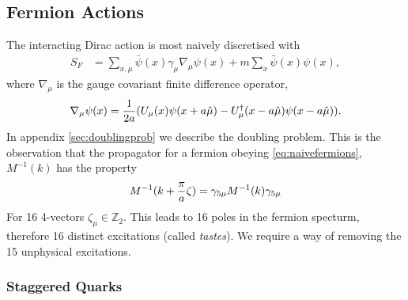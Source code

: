 \documentclass[a4paper,10pt]{article}
\numberwithin{equation}{section}
\begin{document}
\subsection{Fermion Actions}

The interacting Dirac action is most naively discretised with
\begin{align}
 S_F &= \sum_{x,\mu} \bar{\psi}(x) \gamma_{\mu} \nabla_{\mu} \psi(x) + m\sum_x \bar{\psi}(x) \psi(x),
 \label{eq:naivefermions}
\end{align}
where $\nabla_{\mu}$ is the gauge covariant finite difference operator,
\begin{align}	
	\nabla_{\mu} \psi(x) = {1\over 2a} ( U_{\mu} (x) \psi(x+a\hat{\mu}) - U^{\dagger}_{\mu}(x-a\hat{\mu})\psi(x-a\hat{\mu}) ).
\label{eq:lat_derivative}
\end{align}
In appendix \ref{sec:doublingprob} we describe the doubling problem. This is the observation that the propagator for a fermion obeying \eqref{eq:naivefermions}, $M^{-1}(k)$ has the property
\begin{align}
	M^{-1}(k+{\pi\over a}\zeta) = \gamma_{5\mu} M^{-1}(k) \gamma_{5\mu}
\end{align}
For 16 4-vectors $\zeta_{\mu} \in \mathbb{Z}_2$. This leads to 16 poles in the fermion specturm, therefore 16 distinct excitations (called \textit{tastes}). We require a way of removing the 15 unphysical excitations.

\subsubsection{Staggered Quarks}
\end{document}
